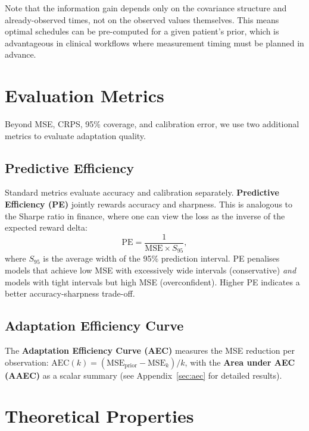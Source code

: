 \documentclass[final]{article}
\begin{document}
Note that the information gain depends only on the covariance structure and already-observed times, not on the observed values themselves. This means optimal schedules can be pre-computed for a given patient's prior, which is advantageous in clinical workflows where measurement timing must be planned in advance.

\section{Evaluation Metrics}
\label{sec:metrics}

Beyond MSE, CRPS, 95\% coverage, and calibration error, we use two additional metrics to evaluate adaptation quality.

\subsection{Predictive Efficiency}

Standard metrics evaluate accuracy and calibration separately. \textbf{Predictive Efficiency (PE)} jointly rewards accuracy and sharpness. This is analogous to the Sharpe ratio in finance, where one can view the loss as the inverse of the expected reward delta:
\begin{equation}
    \mathrm{PE} = \frac{1}{\mathrm{MSE} \times S_{95}},
    \label{eq:pe}
\end{equation}
where $S_{95}$ is the average width of the 95\% prediction interval. PE penalises models that achieve low MSE with excessively wide intervals (conservative) \emph{and} models with tight intervals but high MSE (overconfident). Higher PE indicates a better accuracy-sharpness trade-off.

\subsection{Adaptation Efficiency Curve}

The \textbf{Adaptation Efficiency Curve (AEC)} measures the MSE reduction per observation: $\mathrm{AEC}(k) = (\mathrm{MSE}_{\mathrm{prior}} - \mathrm{MSE}_k) / k$, with the \textbf{Area under AEC (AAEC)} as a scalar summary (see Appendix~\ref{sec:aec} for detailed results).

\section{Theoretical Properties}
\label{sec:theory}
\end{document}

